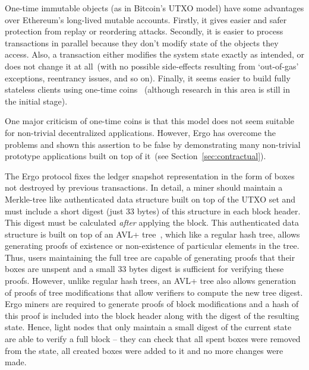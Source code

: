 
One-time immutable objects (as in Bitcoin's UTXO model) have some advantages over Ethereum's long-lived mutable accounts.
Firstly, it gives easier and safer protection from replay or reordering attacks.
Secondly, it is easier to process transactions in parallel because they don't modify state of the objects they access.
Also, a transaction either modifies the system state exactly as intended, or does not change it at all~(with no
possible side-effects resulting from `out-of-gas' exceptions, reentrancy issues, and so on).
Finally, it seems easier to build fully stateless clients using one-time coins~\cite{chepurnoy2018edrax} (although research in this area is still in the initial stage).

One major criticism of one-time coins is that this model does not seem suitable for non-trivial decentralized applications. However, Ergo has overcome the problems and shown this assertion to be false by
demonstrating many non-trivial prototype applications built on top of
it~(see Section~\ref{sec:contractual}).

The Ergo protocol fixes the ledger snapshot representation in the form of boxes not destroyed by previous transactions.
In detail, a miner should maintain a Merkle-tree like authenticated data structure built on top of the UTXO set and must include a short digest (just 33 bytes) of this structure in each block header. This digest must be calculated {\em after} applying the block.
This authenticated data structure is built on top of an AVL+ tree~\cite{reyzin2017improving}, which like a regular hash tree,
allows generating proofs of existence or non-existence of particular elements in the tree.
Thus, users maintaining the full tree are capable of generating proofs that their boxes are unspent and a small 33 bytes digest is sufficient for verifying these proofs.
However, unlike regular hash trees, an AVL+ tree also allows generation of proofs of tree modifications that allow verifiers to compute the new tree digest.
Ergo miners are required to generate proofs of block modifications and a hash of this proof is included into the block header along with the digest of the resulting state.
Hence, light nodes that only maintain a small digest of the current state are able to verify a full block -- they can check that all spent boxes were
removed from the state, all created boxes were added to it and no more changes were made.

